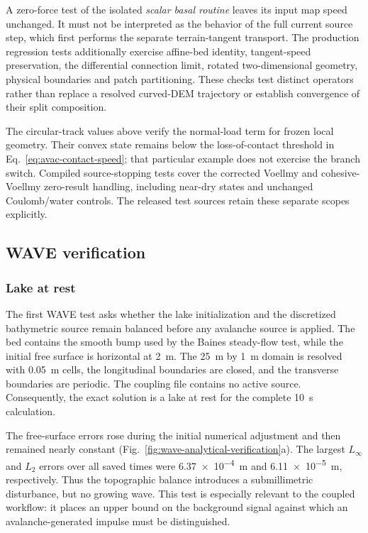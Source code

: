 \documentclass[11pt,a4paper]{article}
\begin{document}
A zero-force test of the isolated \emph{scalar basal routine} leaves its input
map speed unchanged. It must not be interpreted as the behavior of the full
current source step, which first performs the separate terrain-tangent
transport. The production regression tests additionally exercise affine-bed
identity, tangent-speed preservation, the differential connection limit,
rotated two-dimensional geometry, physical boundaries and patch partitioning.
These checks test distinct operators rather than replace a resolved curved-DEM
trajectory or establish convergence of their split composition.

The circular-track values above verify the normal-load term for frozen local
geometry. Their convex state remains below the loss-of-contact threshold in
Eq.~\eqref{eq:avac-contact-speed}; that particular example does not exercise
the branch switch. Compiled source-stopping tests cover the corrected Voellmy
and cohesive-Voellmy zero-result handling, including near-dry states and
unchanged Coulomb/water controls. The released test sources retain these
separate scopes explicitly.



\subsection{WAVE verification}
\label{sec:wave-verification}

\subsubsection{Lake at rest}

The first WAVE test asks whether the lake initialization and the discretized
bathymetric source remain balanced before any avalanche source is applied.
The bed contains the smooth bump used by the Baines steady-flow test, while
the initial free surface is horizontal at \SI{2}{\metre}.  The
\SI{25}{\metre} by \SI{1}{\metre} domain is resolved with
\SI{0.05}{\metre} cells, the longitudinal boundaries are closed, and the
transverse boundaries are periodic.  The coupling file contains no active
source.  Consequently, the exact solution is a lake at rest for the complete
\SI{10}{\second} calculation.

The free-surface errors rose during the initial numerical adjustment and then
remained nearly constant (Fig.~\ref{fig:wave-analytical-verification}a).  The
largest $L_\infty$ and $L_2$ errors over all saved times were
\SI{6.37e-4}{\metre} and \SI{6.11e-5}{\metre}, respectively.  Thus the
topographic balance introduces a submillimetric disturbance, but no growing
wave.  This test is especially relevant to the coupled workflow: it places an
upper bound on the background signal against which an avalanche-generated
impulse must be distinguished.
\end{document}

